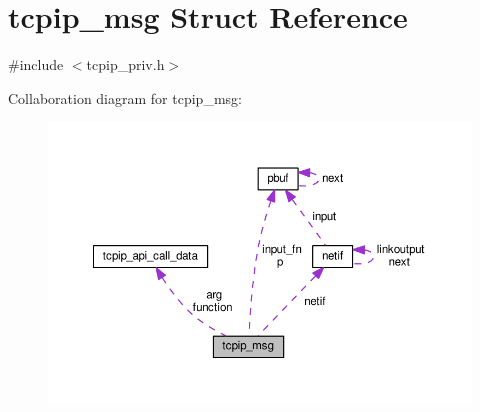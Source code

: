\hypertarget{structtcpip__msg}{}\section{tcpip\+\_\+msg Struct Reference}
\label{structtcpip__msg}


{\ttfamily \#include $<$tcpip\+\_\+priv.\+h$>$}



Collaboration diagram for tcpip\+\_\+msg\+:
\nopagebreak
\begin{figure}[H]
\begin{center}
\leavevmode
\includegraphics[width=350pt]{structtcpip__msg__coll__graph}
\end{center}
\end{figure}
